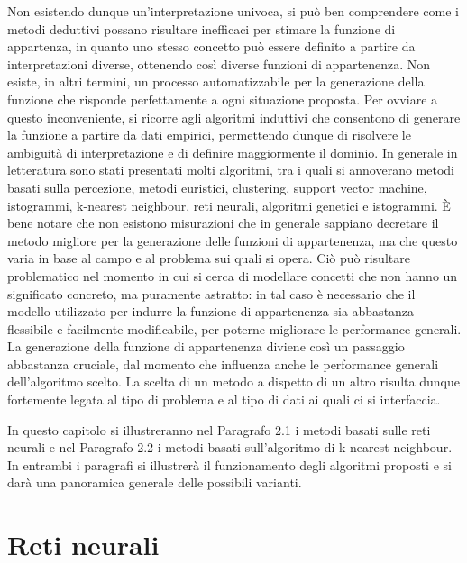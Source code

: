 \documentclass[11pt,  oneside, openany]{book}
\begin{document}
Non esistendo dunque un'interpretazione univoca, si può ben comprendere come i metodi deduttivi possano risultare inefficaci per stimare la funzione di appartenza, in quanto uno stesso concetto può essere definito a partire da interpretazioni diverse, ottenendo così diverse funzioni di appartenenza. Non esiste, in altri termini, un processo automatizzabile per la generazione della funzione che risponde perfettamente a ogni situazione proposta. Per ovviare a questo inconveniente, si ricorre agli algoritmi induttivi che consentono di generare la funzione a partire da dati empirici, permettendo dunque di risolvere le ambiguità di interpretazione e di definire maggiormente il dominio. In generale in letteratura sono stati presentati molti algoritmi, tra i quali si annoverano metodi basati sulla percezione, metodi euristici, clustering, support vector machine, istogrammi, k-nearest neighbour, reti neurali, algoritmi genetici e istogrammi. 
\`E bene notare che non esistono misurazioni che in generale sappiano decretare il metodo migliore per la generazione delle funzioni di appartenenza, ma che questo varia in base al campo e al problema sui quali si opera. Ciò può risultare problematico nel momento in cui si cerca di modellare concetti che non hanno un significato concreto, ma puramente astratto: in tal caso è necessario che il modello utilizzato per indurre la funzione di appartenenza sia abbastanza flessibile e facilmente modificabile, per poterne migliorare le performance generali. La generazione della funzione di appartenenza diviene così un passaggio abbastanza cruciale, dal momento che influenza anche le performance generali dell'algoritmo scelto. La scelta di un metodo a dispetto di un altro risulta dunque fortemente legata al tipo di problema e al tipo di dati ai quali ci si interfaccia. 

In questo capitolo si illustreranno nel Paragrafo 2.1 i metodi basati sulle reti neurali e nel Paragrafo 2.2 i metodi basati sull'algoritmo di k-nearest neighbour. In entrambi i paragrafi si illustrerà il funzionamento degli algoritmi proposti e si darà una panoramica generale delle possibili varianti. 


	\section{Reti neurali}
\end{document}
